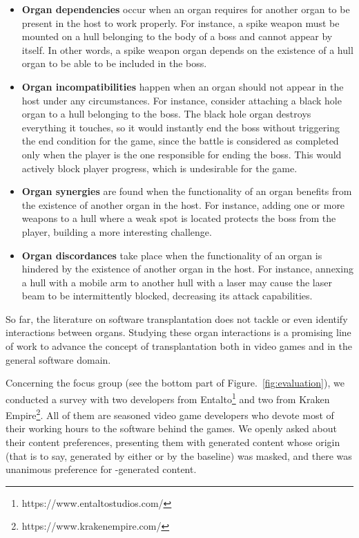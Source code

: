\begin{itemize}
    
    \item \textbf{Organ dependencies} occur when an organ requires for another organ to be present in the host to work properly. For instance, a spike weapon must be mounted on a hull belonging to the body of a boss and cannot appear by itself. In other words, a spike weapon organ depends on the existence of a hull organ to be able to be included in the boss.
    
    \item \textbf{Organ incompatibilities} happen when an organ should not appear in the host under any circumstances. For instance, consider attaching a black hole organ to a hull belonging to the boss. The black hole organ destroys everything it touches, so it would instantly end the boss without triggering the end condition for the game, since the battle is considered as completed only when the player is the one responsible for ending the boss. This would actively block player progress, which is undesirable for the game.
    
    \item \textbf{Organ synergies} are found when the functionality of an organ benefits from the existence of another organ in the host. For instance, adding one or more weapons to a hull where a weak spot is located protects the boss from the player, building a more interesting challenge.
    
    \item \textbf{Organ discordances} take place when the functionality of an organ is hindered by the existence of another organ in the host. For instance, annexing a hull with a mobile arm to another hull with a laser may cause the laser beam to be intermittently blocked, decreasing its attack capabilities.
    
\end{itemize}

So far, the literature on software transplantation does not tackle or even identify interactions between organs. Studying these organ interactions is a promising line of work to advance the concept of  transplantation both in video games and in the general software domain.

Concerning the focus group (see the bottom part of Figure.~\ref{fig:evaluation}), we conducted a survey with two developers from Entalto\footnote{https://www.entaltostudios.com/} and two from Kraken Empire\footnote{https://www.krakenempire.com/}. All of them are seasoned video game developers who devote most of their working hours to the software behind the games. We openly asked about their content preferences, presenting them with generated content whose origin (that is to say, generated by either \ApproachName{} or by the baseline) was masked, and there was unanimous preference for \ApproachName{}-generated content. 


